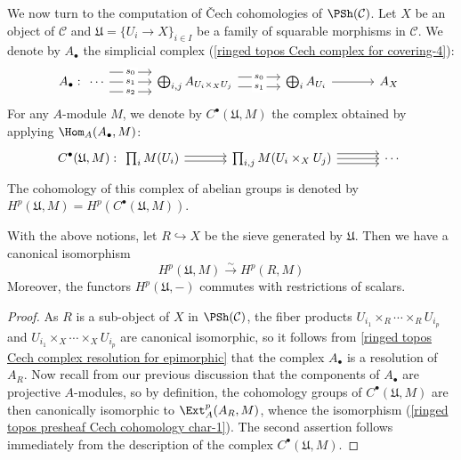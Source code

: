 We now turn to the computation of \v{C}ech cohomologies of $\PSh(\mathcal{C})$. Let $X$ be an object of $\mathcal{C}$ and $\mathfrak{U}=\{U_i\to X\}_{i\in I}$ be a family of squarable morphisms in $\mathcal{C}$. We denote by $A_\bullet$ the simplicial complex (\ref{ringed topos Cech complex for covering-4}):
\[A_\bullet:\begin{tikzcd}[column sep=12mm]
\cdots\ar[r,shift left=8pt,"s_0"description]\ar[r,"s_1"description]\ar[r,shift right=8pt,"s_2"description]
&\bigoplus_{i,j}A_{U_i\times_XU_j}\ar[r,shift left=4pt,"s_0"description]\ar[r,shift right=4pt,"s_1"description]
&\bigoplus_iA_{U_i}\ar[r]
&A_X
\end{tikzcd}\]
For any $A$-module $M$, we denote by $C^\bullet(\mathfrak{U},M)$ the complex obtained by applying $\Hom_A(A_\bullet,M)$:
\[C^\bullet(\mathfrak{U},M):\begin{tikzcd}[column sep=12mm]
\prod_{i}M(U_i)\ar[r,shift left=2pt]\ar[r,shift right=2pt]
&\prod_{i,j}M(U_i\times_XU_j)\ar[r,shift left=4pt]\ar[r]\ar[r,shift right=4pt]
&\cdots
\end{tikzcd}\]
The cohomology of this complex of abelian groups is denoted by $H^p(\mathfrak{U},M)=H^p(C^\bullet(\mathfrak{U},M))$.

\begin{proposition}\label{ringed topos presheaf Cech cohomology char}
With the above notions, let $R\hookrightarrow X$ be the sieve generated by $\mathfrak{U}$. Then we have a canonical isomorphism
\begin{equation}\label{ringed topos presheaf Cech cohomology char-1}
H^p(\mathfrak{U},M) \stackrel{\sim}{\to } H^p(R,M)
\end{equation}
Moreover, the functors $H^p(\mathfrak{U},-)$ commutes with restrictions of scalars.
\end{proposition}
\begin{proof}
As $R$ is a sub-object of $X$ in $\PSh(\mathcal{C})$, the fiber products $U_{i_1}\times_R\cdots\times_RU_{i_p}$ and $U_{i_1}\times_X\cdots\times_XU_{i_p}$ are canonical isomorphic, so it follows from \cref{ringed topos Cech complex resolution for epimorphic} that the complex $A_\bullet$ is a resolution of $A_R$. Now recall from our previous discussion that the components of $A_\bullet$ are projective $A$-modules, so by definition, the cohomology groups of $C^\bullet(\mathfrak{U},M)$ are then canonically isomorphic to $\Ext_A^p(A_R,M)$, whence the isomorphism (\ref{ringed topos presheaf Cech cohomology char-1}). The second assertion follows immediately from the description of the complex $C^\bullet(\mathfrak{U},M)$.
\end{proof}

